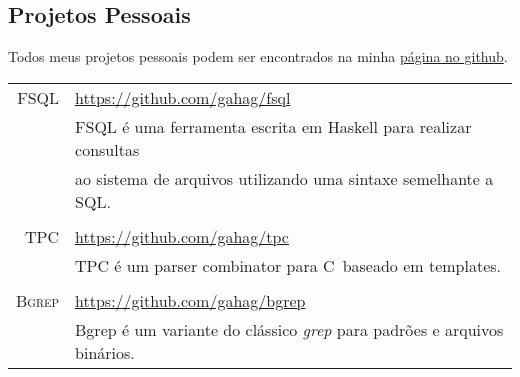 \documentclass[a4paper,10pt]{article}
\newcommand{\cpp}{C\protect\scalebox{0.8}{\protect\raisebox{0.4ex}{++}}}
\renewcommand\#{\protect\scalebox{0.8}{\protect\raisebox{0.4ex}{\char"0023}}}
\begin{document}
\subsection{Projetos Pessoais}
Todos meus projetos pessoais podem ser encontrados na minha \href{https://github.com/gahag/}{página no github}. \\[10pt]
\begin{tabular}{r|l}
  \textsc{FSQL} & \url{https://github.com/gahag/fsql} \\[3pt]
  & FSQL é uma ferramenta escrita em Haskell para realizar consultas \\
  & ao sistema de arquivos utilizando uma sintaxe semelhante a SQL. \\
  
  \multicolumn{2}{c}{} \\
  \textsc{TPC} & \url{https://github.com/gahag/tpc} \\[3pt]
  & TPC é um parser combinator para \cpp\ baseado em templates. \\

  \multicolumn{2}{c}{} \\
  \textsc{Bgrep} & \url{https://github.com/gahag/bgrep} \\[3pt]
  & Bgrep é um variante do clássico \textit{grep} para padrões e arquivos binários. \\
\end{tabular}
\end{document}
